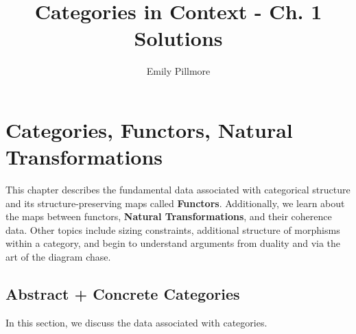 \documentclass[10pt, oneside]{article}   	%
\title{Categories in Context - Ch. 1 Solutions}
\author{Emily Pillmore}
\begin{document}
\maketitle

\section{Categories, Functors, Natural Transformations}

This chapter describes the fundamental data associated with categorical structure and its structure-preserving maps called \textbf{Functors}. Additionally, we learn about the maps between functors, \textbf{Natural Transformations}, and their coherence data. Other topics include sizing constraints, additional structure of morphisms within a category, and begin to understand arguments from duality and via the art of the diagram chase.

\subsection{Abstract + Concrete Categories}

In this section, we discuss the data associated with categories. 

\subsubsection{}
\end{document}
